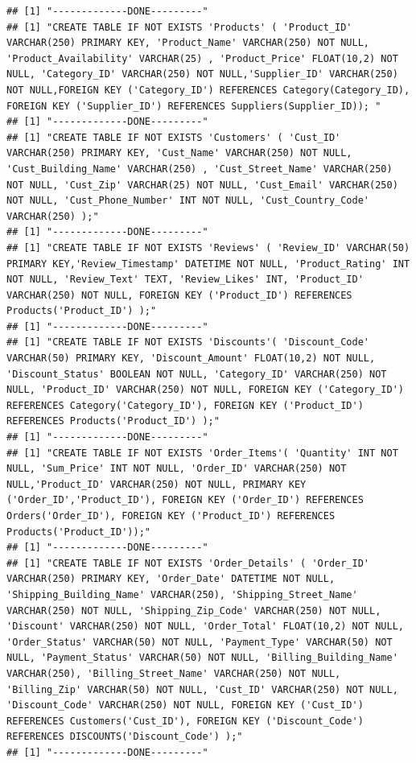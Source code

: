 \documentclass[
]{article}
\begin{document}
\begin{verbatim}
## [1] "-------------DONE---------"
## [1] "CREATE TABLE IF NOT EXISTS 'Products' ( 'Product_ID' VARCHAR(250) PRIMARY KEY, 'Product_Name' VARCHAR(250) NOT NULL, 'Product_Availability' VARCHAR(25) , 'Product_Price' FLOAT(10,2) NOT NULL, 'Category_ID' VARCHAR(250) NOT NULL,'Supplier_ID' VARCHAR(250) NOT NULL,FOREIGN KEY ('Category_ID') REFERENCES Category(Category_ID), FOREIGN KEY ('Supplier_ID') REFERENCES Suppliers(Supplier_ID)); "
## [1] "-------------DONE---------"
## [1] "CREATE TABLE IF NOT EXISTS 'Customers' ( 'Cust_ID' VARCHAR(250) PRIMARY KEY, 'Cust_Name' VARCHAR(250) NOT NULL, 'Cust_Building_Name' VARCHAR(250) , 'Cust_Street_Name' VARCHAR(250) NOT NULL, 'Cust_Zip' VARCHAR(25) NOT NULL, 'Cust_Email' VARCHAR(250) NOT NULL, 'Cust_Phone_Number' INT NOT NULL, 'Cust_Country_Code' VARCHAR(250) );"
## [1] "-------------DONE---------"
## [1] "CREATE TABLE IF NOT EXISTS 'Reviews' ( 'Review_ID' VARCHAR(50) PRIMARY KEY,'Review_Timestamp' DATETIME NOT NULL, 'Product_Rating' INT NOT NULL, 'Review_Text' TEXT, 'Review_Likes' INT, 'Product_ID' VARCHAR(250) NOT NULL, FOREIGN KEY ('Product_ID') REFERENCES Products('Product_ID') );"
## [1] "-------------DONE---------"
## [1] "CREATE TABLE IF NOT EXISTS 'Discounts'( 'Discount_Code' VARCHAR(50) PRIMARY KEY, 'Discount_Amount' FLOAT(10,2) NOT NULL, 'Discount_Status' BOOLEAN NOT NULL, 'Category_ID' VARCHAR(250) NOT NULL, 'Product_ID' VARCHAR(250) NOT NULL, FOREIGN KEY ('Category_ID') REFERENCES Category('Category_ID'), FOREIGN KEY ('Product_ID') REFERENCES Products('Product_ID') );"
## [1] "-------------DONE---------"
## [1] "CREATE TABLE IF NOT EXISTS 'Order_Items'( 'Quantity' INT NOT NULL, 'Sum_Price' INT NOT NULL, 'Order_ID' VARCHAR(250) NOT NULL,'Product_ID' VARCHAR(250) NOT NULL, PRIMARY KEY ('Order_ID','Product_ID'), FOREIGN KEY ('Order_ID') REFERENCES Orders('Order_ID'), FOREIGN KEY ('Product_ID') REFERENCES Products('Product_ID'));"
## [1] "-------------DONE---------"
## [1] "CREATE TABLE IF NOT EXISTS 'Order_Details' ( 'Order_ID'  VARCHAR(250) PRIMARY KEY, 'Order_Date' DATETIME NOT NULL, 'Shipping_Building_Name' VARCHAR(250), 'Shipping_Street_Name' VARCHAR(250) NOT NULL, 'Shipping_Zip_Code' VARCHAR(250) NOT NULL, 'Discount' VARCHAR(250) NOT NULL, 'Order_Total' FLOAT(10,2) NOT NULL, 'Order_Status' VARCHAR(50) NOT NULL, 'Payment_Type' VARCHAR(50) NOT NULL, 'Payment_Status' VARCHAR(50) NOT NULL, 'Billing_Building_Name' VARCHAR(250), 'Billing_Street_Name' VARCHAR(250) NOT NULL, 'Billing_Zip' VARCHAR(50) NOT NULL, 'Cust_ID' VARCHAR(250) NOT NULL, 'Discount_Code' VARCHAR(250) NOT NULL, FOREIGN KEY ('Cust_ID') REFERENCES Customers('Cust_ID'), FOREIGN KEY ('Discount_Code') REFERENCES DISCOUNTS('Discount_Code') );"
## [1] "-------------DONE---------"
\end{verbatim}
\end{document}
